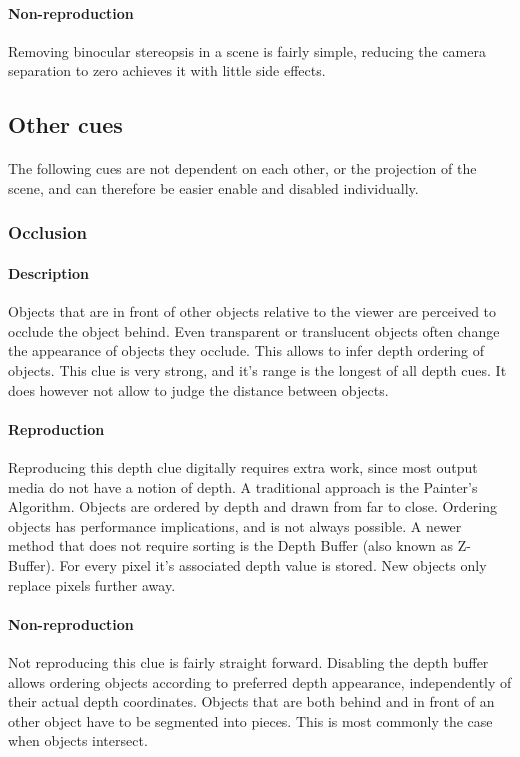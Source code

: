 \paragraph{Non-reproduction}
Removing binocular stereopsis in a scene is fairly simple, reducing the camera separation to zero achieves it with little side effects.


\subsection{Other cues}
\paragraph{}
The following cues are not dependent on each other, or the projection of the scene, and can therefore be easier enable and disabled individually.

\subsubsection{Occlusion}
\paragraph{Description}
Objects that are in front of other objects relative to the viewer are perceived to occlude the object behind. Even transparent or translucent objects often change the appearance of objects they occlude. This allows to infer depth ordering of objects. This clue is very strong, and it's range is the longest of all depth cues. It does however not allow to judge the distance between objects.

\paragraph{Reproduction}
Reproducing this depth clue digitally requires extra work, since most output media do not have a notion of depth. A traditional approach is the Painter's Algorithm\cite{painters}. Objects are ordered by depth and drawn from far to close. Ordering objects has performance implications, and is not always possible.
A newer method that does not require sorting is the Depth Buffer\cite{zbuffer} (also known as Z-Buffer). For every pixel it's associated depth value is stored. New objects only replace pixels further away.

\paragraph{Non-reproduction}
Not reproducing this clue is fairly straight forward. Disabling the depth buffer allows ordering objects according to preferred depth appearance, independently of their actual depth coordinates. Objects that are both behind and in front of an other object have to be segmented into pieces. This is most commonly the case when objects intersect.

